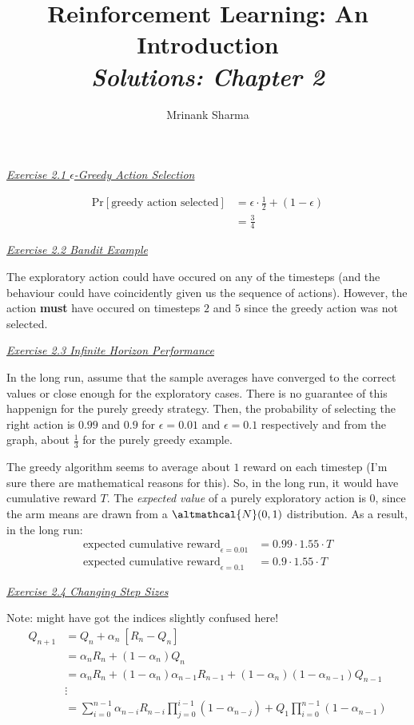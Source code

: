 \documentclass{article}
\title{\textbf{Reinforcement Learning: An Introduction}\\
\textit{Solutions: Chapter 2}
}
\author{Mrinank Sharma}
\newcommand{\myq}[1]{%
	\vspace{1em}
	\noindent\underline{\emph{Exercise #1}}\vspace{0.25em}\linebreak
}
\begin{document}
\maketitle

\myq{2.1 $\epsilon$-Greedy Action Selection}
\begin{align}
\text{Pr}[\text{greedy action selected}] &= \epsilon \cdot \frac{1}{2} + (1 - \epsilon) \\
&= \frac{3}{4}
\end{align}

\myq{2.2 Bandit Example}
The exploratory action could have occured on any of the timesteps (and the behaviour could have coincidently given us the sequence of actions). However, the action \textbf{must} have occured on timesteps $2$ and $5$ since the greedy action was not selected. 

\myq{2.3 Infinite Horizon Performance}
In the long run, assume that the sample averages have converged to the correct values or close enough for the exploratory cases. There is no guarantee of this happenign for the purely greedy strategy. Then, the probability of selecting the right action is $0.99$ and $0.9$ for $\epsilon=0.01$ and $\epsilon=0.1$ respectively and from the graph, about $\frac{1}{3}$ for the purely greedy example. 

The greedy algorithm seems to average about $1$ reward on each timestep (I'm sure there are mathematical reasons for this). So, in the long run, it would have cumulative reward $T$. The \emph{expected value} of a purely exploratory action is $0$, since the arm means are drawn from a $\altmathcal{N}(0, 1)$ distribution. As a result, in the long run:
\begin{align}
\text{expected cumulative reward}_{\epsilon=0.01} &= 0.99 \cdot 1.55\cdot T\\
\text{expected cumulative reward}_{\epsilon=0.1} &= 0.9 \cdot 1.55\cdot T 
\end{align}

\myq{2.4 Changing Step Sizes}
Note: might have got the indices slightly confused here!
\begin{align}
Q_{n+1} &= Q_n + \alpha_n\ [R_n - Q_n] \nonumber\\ 
&= \alpha_n R_n + (1-\alpha_n) Q_n \nonumber \\
&= \alpha_n R_n +  (1-\alpha_n) \alpha_{n-1} R_{n-1} + (1-\alpha_n)  (1-\alpha_{n-1}) Q_{n-1} \nonumber\\
& \vdots \nonumber \\
& = \sum_{i=0}^{n-1} \alpha_{n-i} R_{n-i} \prod_{j=0}^{i-1} (1 - \alpha_{n-j}) + Q_1 \prod_{i=0}^{n-1} (1-\alpha_{n-1})
\end{align}
\end{document}
